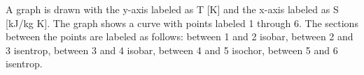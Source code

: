 A graph is drawn with the y-axis labeled as T [K] and the x-axis labeled as S [kJ/kg K]. The graph shows a curve with points labeled 1 through 6. The sections between the points are labeled as follows: between 1 and 2 isobar, between 2 and 3 isentrop, between 3 and 4 isobar, between 4 and 5 isochor, between 5 and 6 isentrop.